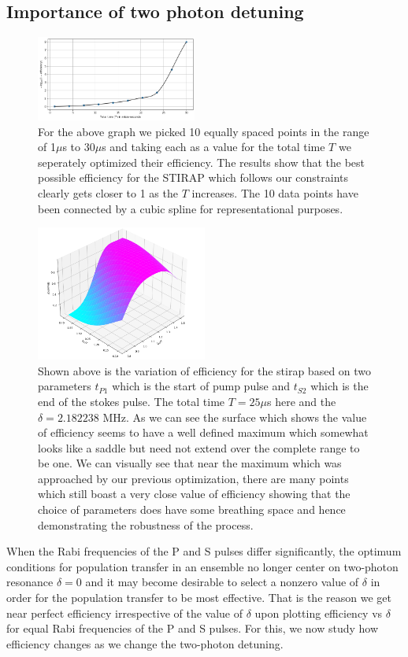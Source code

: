 \documentclass[%
 reprint,
 amsmath,amssymb,
 aps,
]{revtex4-2}
\begin{document}
\subsection{Importance of two photon detuning}
\begin{figure}[ht]
    \centering
    \includegraphics[width=0.47\textwidth]{images/stirap dependence on total time.png}
    \caption{For the above graph we picked 10 equally spaced points in the range of 1$\mu$s to 30$\mu$s and taking each as a value for the total time $T$ we seperately optimized their efficiency. The results show that the best possible efficiency for the STIRAP which follows our constraints clearly gets closer to 1 as the $T$ increases. The 10 data points have been connected by a cubic spline for representational purposes.}
    \label{fig:efftimes}
\end{figure}
\begin{figure}[ht]
    \centering
    \includegraphics[width=0.5\textwidth]{images/stirap-eff-25-mu.png}
    \caption{Shown above is the variation of efficiency for the stirap based on two parameters $t_{P1}$ which is the start of pump pulse and $t_{S2}$ which is the end of the stokes pulse. The total time $T=25\mu$s here and the $\delta=2.182238$ MHz. As we can see the surface which shows the value of efficiency seems to have a well defined maximum which somewhat looks like a saddle but need not extend over the complete range to be one. We can visually see that near the maximum which was approached by our previous optimization, there are many points which still boast a very close value of efficiency showing that the choice of parameters does have some breathing space and hence demonstrating the robustness of the process.}
    \label{fig:eff25}
\end{figure}
When the Rabi
frequencies of the P and S pulses differ significantly, the optimum conditions for population transfer in an ensemble
no longer center on two-photon resonance $\delta=0$ and it may become desirable to select
a nonzero value of $\delta$ in order for the population transfer to be most effective\cite{stirap}. That is the reason we get near perfect efficiency irrespective of the value of $\delta$ upon plotting efficiency vs $\delta$ for equal Rabi
frequencies of the P and S pulses. For this, we now study how efficiency changes as we change the two-photon detuning.
\end{document}
